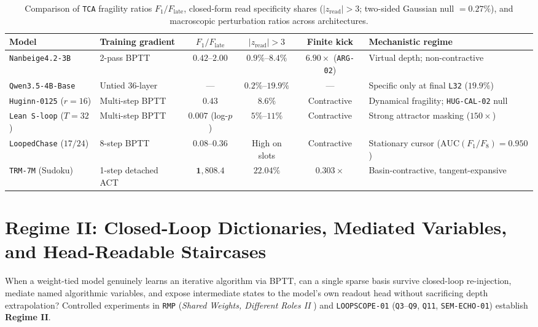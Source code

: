 \documentclass[10pt,letterpaper]{article}
\begin{document}
\begin{table}[t]
\centering
\small
\begin{tabularx}{\linewidth}{@{}llccc>{\raggedright\arraybackslash}X@{}}
\toprule
Model & Training gradient & $F_1 / F_{\mathrm{late}}$ & $|z_{\mathrm{read}}|{>}3$ & Finite kick & Mechanistic regime \\
\midrule
\texttt{Nanbeige4.2-3B} & 2-pass BPTT & $0.42$--$2.00$ & $0.9\%$--$8.4\%$ & $6.90\times$ (\texttt{ARG-02}) & Virtual depth; non-contractive \\
\texttt{Qwen3.5-4B-Base} & Untied 36-layer & --- & $0.2\%$--$19.9\%$ & --- & Specific only at final \texttt{L32} ($19.9\%$) \\
\texttt{Huginn-0125} ($r{=}16$) & Multi-step BPTT & $0.43$ & $8.6\%$ & Contractive & Dynamical fragility; \texttt{HUG-CAL-02} null \\
\texttt{Lean S-loop} ($T{=}32$) & Multi-step BPTT & $0.007$ (log-$p$) & $5\%$--$11\%$ & Contractive & Strong attractor masking ($150\times$) \\
\texttt{LoopedChase} ($17/24$) & 8-step BPTT & $0.08$--$0.36$ & High on slots & Contractive & Stationary cursor ($\mathrm{AUC}(F_1/F_8){=}0.950$) \\
\texttt{TRM-7M} (Sudoku) & 1-step detached ACT & $\mathbf{1{,}808.4}$ & $\mathbf{22.04\%}$ & $\mathbf{0.303\times}$ & Basin-contractive, tangent-expansive \\
\bottomrule
\end{tabularx}
\caption{Comparison of \texttt{TCA} fragility ratios $F_1/F_{\mathrm{late}}$, closed-form read specificity shares ($|z_{\mathrm{read}}|>3$; two-sided Gaussian null $= 0.27\%$), and macroscopic perturbation ratios across architectures.}
\label{tab:tca_summary}
\end{table}

\section{Regime II: Closed-Loop Dictionaries, Mediated Variables, and Head-Readable Staircases}\label{sec:regime2}

When a weight-tied model genuinely learns an iterative algorithm via BPTT, can a single sparse basis survive closed-loop re-injection, mediate named algorithmic variables, and expose intermediate states to the model's own readout head without sacrificing depth extrapolation? Controlled experiments in \texttt{RMP} (\emph{Shared Weights, Different Roles II} \cite{dugan2026rmp}) and \texttt{LOOPSCOPE-01} (\texttt{Q3}--\texttt{Q9}, \texttt{Q11}, \texttt{SEM-ECHO-01}) establish \textbf{Regime II}.
\end{document}
